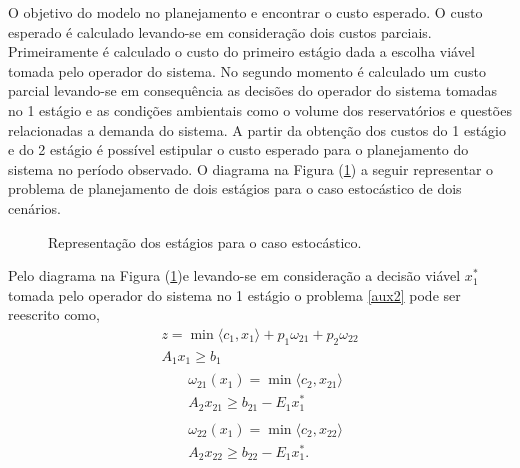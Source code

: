 O objetivo do
modelo no planejamento e encontrar o custo esperado. O custo esperado \'e calculado levando-se em considera\c c\~ao dois
custos parciais. Primeiramente \'e calculado o custo do primeiro est\'agio dada a escolha vi\'avel tomada pelo
operador do sistema. No segundo momento \'e calculado um custo parcial levando-se em consequ\^encia as decis\~oes do
operador do sistema tomadas no 1 est\'agio e as condi\c c\~oes ambientais como o volume dos reservat\'orios e quest\~oes 
relacionadas a demanda do sistema. A partir da obten\c c\~ao dos custos do 1 est\'agio e do 2 est\'agio \'e poss\'ivel
estipular o custo esperado para o planejamento do sistema no per\'iodo observado. 
O diagrama na Figura (\ref{estocastico}) a seguir representar o problema de planejamento de dois est\'agios para o caso
estoc\'astico de dois cen\'arios.

\begin{figure}[!h]
 \centering
\caption{Representa\c c\~ao dos est\'agios para o caso estoc\'astico.}
 \label{estocastico}
\end{figure}
Pelo diagrama na Figura (\ref{estocastico})e levando-se em considera\c c\~ao a decis\~ao vi\'avel $x_1^{*}$ tomada pelo
operador do sistema no 1 est\'agio o problema \ref {aux2} pode ser reescrito como,
{\setlength{\belowdisplayskip}{-10pt}
\begin{align*}
  z = \min  \langle c_1,x_1\rangle + p_1{\omega}_{21} + p_2 {\omega}_{22} \nonumber \\	
	A_1 x_1 \geq b_1
  \end{align*}%
\begin{align}
	\label{principal}
  \begin{split}	
  &\omega_{21}(x_1) =\min \langle c_2,x_{21}\rangle \\
  & A_2 x_{21} \geq b_{21} - E_1 x_1^{*} 
  \end{split}
	\end{align}}%
\begin{align}
  \begin{split}	
 	&\omega_{22}(x_1) = \min  \langle c_2,x_{22}\rangle \\ \nonumber
	&A_2x_{22} \geq b_{22} - E_1 x_1^{*}. 
  \end{split}
   \end{align}%

